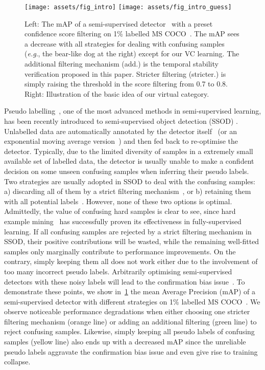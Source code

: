 \documentclass[runningheads]{llncs}
\def\eg{\emph{e.g}., } \def\Eg{\emph{E.g}., }
\begin{document}
\begin{figure}[t]
\centering
\texttt{[image: assets/fig\_intro]}
\hspace{2em}
\texttt{[image: assets/fig\_intro\_guess]}
\vspace{-5px}
\caption{Left: The mAP of a semi-supervised detector~\cite{Yen-Cheng_2021_Unb} with a preset confidence score filtering on 1\% labelled MS COCO~\cite{Tsung-Yi_2014_Mic}. The mAP sees a decrease with all strategies for dealing with confusing samples (\eg the bear-like dog at the right) except for our VC learning. The additional filtering mechanism (add.) is the temporal stability verification proposed in this paper. Stricter filtering (stricter.) is simply raising the threshold in the score filtering from 0.7 to 0.8. Right: Illustration of the basic idea of our virtual category.}\label{fig:intro}
\vspace{-2em}
\end{figure}

Pseudo labelling~\cite{Lee_2013_Pse}, one of the most advanced methods in semi-supervised learning, has been recently introduced to semi-supervised object detection (SSOD) \cite{Yen-Cheng_2021_Unb,Qiang_2021_Ins,Qize_2021_Int,Mengde_2021_End}. Unlabelled data are automatically annotated by the detector itself~\cite{Kihyuk_2020_SATC} (or an exponential moving average version~\cite{Yen-Cheng_2021_Unb}) and then fed back to re-optimise the detector. Typically, due to the limited diversity of samples in a extremely small available set of labelled data, the detector is usually unable to make a confident decision on some unseen confusing samples when inferring their pseudo labels. Two strategies are usually adopted in SSOD to deal with the confusing samples: a) discarding all of them by a strict filtering mechanism~\cite{Kihyuk_2020_SATC}, or b) retaining them with all potential labels~\cite{Qize_2021_Int}. However, none of these two options is optimal. Admittedly, the value of confusing hard samples is clear to see, since hard example mining~\cite{Abhinav_2016_Tra} has successfully proven its effectiveness in fully-supervised learning. If all confusing samples are rejected by a strict filtering mechanism in SSOD, their positive contributions will be wasted, while the remaining well-fitted samples only marginally contribute to performance improvements. On the contrary, simply keeping them all does not work either due to the involvement of too many incorrect pseudo labels. Arbitrarily optimising semi-supervised detectors with these noisy labels will lead to the confirmation bias issue~\cite{Eric_2020_Pse}. To demonstrate these points, we show in~\cref{fig:intro} the mean Average Precision (mAP) of a semi-supervised detector with different strategies on 1\% labelled MS COCO~\cite{Tsung-Yi_2014_Mic}. We observe noticeable performance degradations when either choosing one stricter filtering mechanism (orange line) or adding an additional filtering (green line) to reject confusing samples. Likewise, simply keeping all pseudo labels of confusing samples (yellow line) also ends up with a decreased mAP since the unreliable pseudo labels aggravate the confirmation bias issue and even give rise to training collapse.
\end{document}
